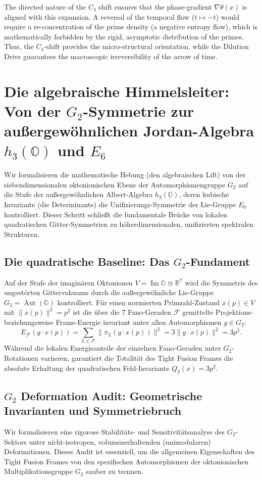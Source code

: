 \documentclass[11pt,a4paper]{article}
\theoremstyle{definition}
\begin{document}
	The directed nature of the $C_4$ shift ensures that the phase-gradient $\nabla \theta(x)$ is aligned with this expansion. A reversal of the temporal flow ($t \mapsto -t$) would require a re-concentration of the prime density (a negative entropy flow), which is mathematically forbidden by the rigid, asymptotic distribution of the primes. Thus, the $C_4$-shift provides the micro-structural orientation, while the Dilution Drive guarantees the macroscopic irreversibility of the arrow of time.
	
	
	\section{Die algebraische Himmelsleiter: Von der $G_2$-Symmetrie zur außergewöhnlichen Jordan-Algebra $h_3(\mathbb{O})$ und $E_6$}
	\label{sec:g2_jordan_e6_bridge}
	
	Wir formalisieren die mathematische Hebung (den algebraischen Lift) von der siebendimensionalen oktonionischen Ebene der Automorphismengruppe $G_2$ auf die Stufe der außergewöhnlichen Albert-Algebra $h_3(\mathbb{O})$, deren kubische Invariante (die Determinante) die Unifizierungs-Symmetrie der Lie-Gruppe $E_6$ kontrolliert. Dieser Schritt schließt die fundamentale Brücke von lokalen quadratischen Gitter-Symmetrien zu höherdimensionalen, unifizierten spektralen Strukturen.
	
	\subsection{Die quadratische Baseline: Das $G_2$-Fundament}
	Auf der Stufe der imaginären Oktonionen $V = \operatorname{Im}\mathbb{O} \cong \mathbb{R}^7$ wird die Symmetrie des ungestörten Gittervakuums durch die außergewöhnliche Lie-Gruppe $G_2 = \operatorname{Aut}(\mathbb{O})$ kontrolliert. Für einen normierten Primzahl-Zustand $x(p) \in V$ mit $\|x(p)\|^2 = p^2$ ist die über die 7 Fano-Geraden $\mathcal{F}$ gemittelte Projektions- beziehungsweise Frame-Energie invariant unter allen Automorphismen $g \in G_2$:
	\begin{equation}
		E_{\mathcal{F}}(g \cdot x(p)) = \sum_{L \in \mathcal{F}} \|\pi_L (g \cdot x(p))\|^2 = 3 \|g \cdot x(p)\|^2 = 3p^2.
	\end{equation}
	Während die lokalen Energieanteile der einzelnen Fano-Geraden unter $G_2$-Rotationen variieren, garantiert die Totalität des Tight Fusion Frames die absolute Erhaltung der quadratischen Feld-Invariante $Q_2(x) = 3p^2$. 
	
	\subsection{$G_2$ Deformation Audit: Geometrische Invarianten und Symmetriebruch}
	\label{sec:g2_deformation_audit}
	Wir formalisieren eine rigorose Stabilitäts- und Sensitivitätsanalyse des $G_2$-Sektors unter nicht-isotropen, volumenerhaltenden (unimodularen) Deformationen. Dieses Audit ist essenziell, um die allgemeinen Eigenschaften des Tight Fusion Frames von den spezifischen Automorphismen der oktonionischen Multiplikationsgruppe $G_2$ sauber zu trennen.
	
\end{document}
